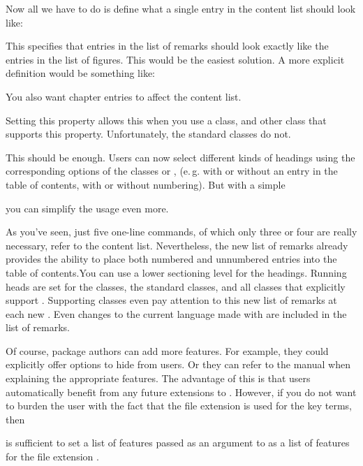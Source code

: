 Now all we have to do is define what a single entry in the
content list should look like:
\begin{lstcode}
  \newcommand*{\l@remarkbox}{\l@figure}
\end{lstcode}
This specifies that entries in the list of remarks should look exactly like the
entries in the list of figures. This would be the easiest solution. A more
explicit definition would be something like:
\begin{lstcode}
\end{lstcode}

You also want chapter entries to affect the content
list.
\begin{lstcode}
\end{lstcode}
Setting this property allows this when you use a \KOMAScript{} class, and other class
that supports this property. Unfortunately, the standard classes do not.

This should be enough. Users can now
select different kinds of headings using the corresponding options of
the \KOMAScript{} classes or , (e.\,g. with
or without an entry in the table of contents, with or without numbering). But
with a simple
\begin{lstcode}
  \newcommand*{\listofremarkboxes}{\listoftoc{lor}}
\end{lstcode}
you can simplify the usage even more.

As you've seen, just five one-line commands, of which only three or four are
really necessary, refer to the content list. Nevertheless, the new list of
remarks already provides the ability to place both numbered and unnumbered
entries into the table of contents.You can use a lower sectioning level for
the headings. Running heads are set for the \KOMAScript{} classes, the
standard classes, and all classes that explicitly support .
Supporting classes even pay attention to this new list of remarks at each new
. Even changes to the current language made with
 are included in the list of remarks.

Of course, package authors can add more
features. For example, they could explicitly offer options to hide
 from users. Or they can refer to the
 manual when explaining the appropriate features. The
advantage of this is that users automatically benefit from any future
extensions to . However, if you do not want to burden the
user with the fact that the file extension  is used for the key
terms, then
\begin{lstcode}
  \newcommand*{\setupremarkboxes}{\setuptoc{lor}}
\end{lstcode}
is sufficient to set a list of features passed as an argument to
 as a list of features for the file extension
.

